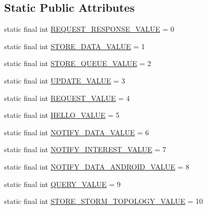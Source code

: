 \subsection*{Static Public Attributes}
\begin{DoxyCompactItemize}
\item 
static final int \hyperlink{enumcom_1_1rutgers_1_1Core_1_1Message_1_1ARMessage_1_1Action_a7535daaca4ea96d18c35c8b5a01b8378}{R\+E\+Q\+U\+E\+S\+T\+\_\+\+R\+E\+S\+P\+O\+N\+S\+E\+\_\+\+V\+A\+L\+UE} = 0
\item 
static final int \hyperlink{enumcom_1_1rutgers_1_1Core_1_1Message_1_1ARMessage_1_1Action_adbb69893c4ff87d2e8b9e92d90aec340}{S\+T\+O\+R\+E\+\_\+\+D\+A\+T\+A\+\_\+\+V\+A\+L\+UE} = 1
\item 
static final int \hyperlink{enumcom_1_1rutgers_1_1Core_1_1Message_1_1ARMessage_1_1Action_ab1008f6faf54881446e0a05c0ec8c35e}{S\+T\+O\+R\+E\+\_\+\+Q\+U\+E\+U\+E\+\_\+\+V\+A\+L\+UE} = 2
\item 
static final int \hyperlink{enumcom_1_1rutgers_1_1Core_1_1Message_1_1ARMessage_1_1Action_a23a05de08992c8780b16c71f602f062b}{U\+P\+D\+A\+T\+E\+\_\+\+V\+A\+L\+UE} = 3
\item 
static final int \hyperlink{enumcom_1_1rutgers_1_1Core_1_1Message_1_1ARMessage_1_1Action_aed1630c754d1d4ecb650dc8df0bf17e0}{R\+E\+Q\+U\+E\+S\+T\+\_\+\+V\+A\+L\+UE} = 4
\item 
static final int \hyperlink{enumcom_1_1rutgers_1_1Core_1_1Message_1_1ARMessage_1_1Action_abc5fdd737021d4a573f47b4c78163539}{H\+E\+L\+L\+O\+\_\+\+V\+A\+L\+UE} = 5
\item 
static final int \hyperlink{enumcom_1_1rutgers_1_1Core_1_1Message_1_1ARMessage_1_1Action_ad7f5b6bea782be4d992bb209bc674d17}{N\+O\+T\+I\+F\+Y\+\_\+\+D\+A\+T\+A\+\_\+\+V\+A\+L\+UE} = 6
\item 
static final int \hyperlink{enumcom_1_1rutgers_1_1Core_1_1Message_1_1ARMessage_1_1Action_a659c18e85873d2983c908b6bab4e40bf}{N\+O\+T\+I\+F\+Y\+\_\+\+I\+N\+T\+E\+R\+E\+S\+T\+\_\+\+V\+A\+L\+UE} = 7
\item 
static final int \hyperlink{enumcom_1_1rutgers_1_1Core_1_1Message_1_1ARMessage_1_1Action_af1a47bcb3a4907466f5fb518198319fd}{N\+O\+T\+I\+F\+Y\+\_\+\+D\+A\+T\+A\+\_\+\+A\+N\+D\+R\+O\+I\+D\+\_\+\+V\+A\+L\+UE} = 8
\item 
static final int \hyperlink{enumcom_1_1rutgers_1_1Core_1_1Message_1_1ARMessage_1_1Action_a63ee9318d02b99041a81b7ee2581abcf}{Q\+U\+E\+R\+Y\+\_\+\+V\+A\+L\+UE} = 9
\item 
static final int \hyperlink{enumcom_1_1rutgers_1_1Core_1_1Message_1_1ARMessage_1_1Action_a0b8ff174e309dc005416ac20bdc9e550}{S\+T\+O\+R\+E\+\_\+\+S\+T\+O\+R\+M\+\_\+\+T\+O\+P\+O\+L\+O\+G\+Y\+\_\+\+V\+A\+L\+UE} = 10

\end{DoxyCompactItemize}
